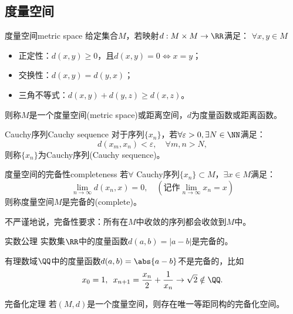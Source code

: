 \subsection{度量空间}

\begin{definition}
    {度量空间}{metric space}
    给定集合$M$，若映射$d:M\times M\to\RR$满足：
    $\forall x,y\in M$
    \begin{itemize}
        \item 正定性：$d(x,y)\geq 0$，且$d(x,y)=0\iff x=y$；
        \item 交换性：$d(x,y)=d(y,x)$；
        \item 三角不等式：$d(x,y)+d(y,z)\geq d(x,z)$。
    \end{itemize}
    则称$M$是一个度量空间(metric space)或距离空间，$d$为度量函数或距离函数。
\end{definition}

\begin{definition}
    {Cauchy序列}{Cauchy sequence}
    对于序列$\{x_n\}$，若$\forall\varepsilon>0,\exists N\in\NN$满足：
    \begin{equation}
        d(x_m,x_n)<\varepsilon,\quad\forall m,n>N,
    \end{equation}
    则称$\{x_n\}$为Cauchy序列(Cauchy sequence)。
\end{definition}

\begin{definition}
    {度量空间的完备性}{completeness}
    若$\forall$ Cauchy序列$\{x_n\}\subset M$，$\exists x\in M$满足：
    \[
        \lim_{n\to\infty}d(x_n,x)=0,\quad(\text{记作}\lim_{n\to\infty}x_n=x)
    \]
    则称度量空间$M$是完备的(complete)。
\end{definition}

\begin{remark}
    不严谨地说，完备性要求：所有在$M$中收敛的序列都会收敛到$M$中。%
\end{remark}

\begin{example}
    {实数公理}{}
    实数集$\RR$中的度量函数$d(a,b)=|a-b|$是完备的。
\end{example}

\begin{remark}
    有理数域$\QQ$中的度量函数$d(a,b)=\abs{a-b}$不是完备的，比如
    \[
        x_0=1,\enspace x_{n+1}=\frac{x_n}2+\frac1{x_n}\to\sqrt2\notin\QQ.
    \]
\end{remark}

\begin{theorem}
    {完备化定理}{}
    若$(M,d)$是一个度量空间，则存在唯一等距同构的完备化空间。%
\end{theorem}

